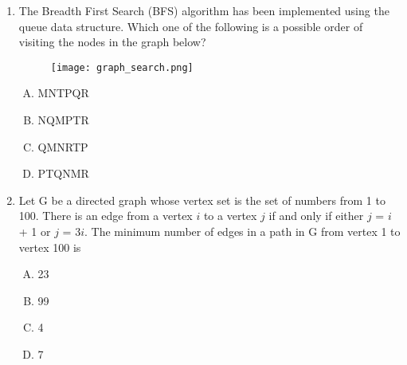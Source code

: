 \documentclass[11pt]{exam}
\begin{document}
\begin{enumerate}
    \item The Breadth First Search (BFS) algorithm has been implemented using the queue data structure. Which one of the following is a possible order of visiting the nodes in the graph below?
    \begin{figure}[H]
    \centering
    \texttt{[image: graph\_search.png]}
    \end{figure}
    \begin{enumerate}[A.]
        \item MNTPQR
        \item NQMPTR
        \item QMNRTP
        \item PTQNMR
    \end{enumerate}
    \begin{solution}
    \end{solution}
    
    \item Let G be a directed graph whose vertex set is the set of numbers from 1 to 100. There is an edge from a vertex $i$ to a vertex $j$ if and only if either $j$ = $i$ + 1 or $j$ = 3$i$. The minimum number of edges in a path in G from vertex 1 to vertex 100 is
    \begin{enumerate}[A.]
        \item 23
        \item 99
        \item 4
        \item 7
    \end{enumerate}
    \begin{solution}
    \end{solution}
\end{enumerate}
\end{document}
